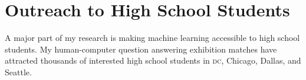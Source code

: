 \documentclass[11pt]{amsart}
\newcommand{\student}[1]{\vspace{.5cm}\fbox{\parbox{0.95\linewidth}{{\small #1}}}\vspace{.5cm}}
\newcommand{\abr}[1]{\textsc{#1}}
\begin{document}
\section{Outreach to High School Students}

A major part of my research is making machine learning accessible to
high school students.  My human-computer question answering exhibition
matches have attracted thousands of interested high school students in
\abr{dc}, Chicago, Dallas, and Seattle.











%
%
\end{document}
